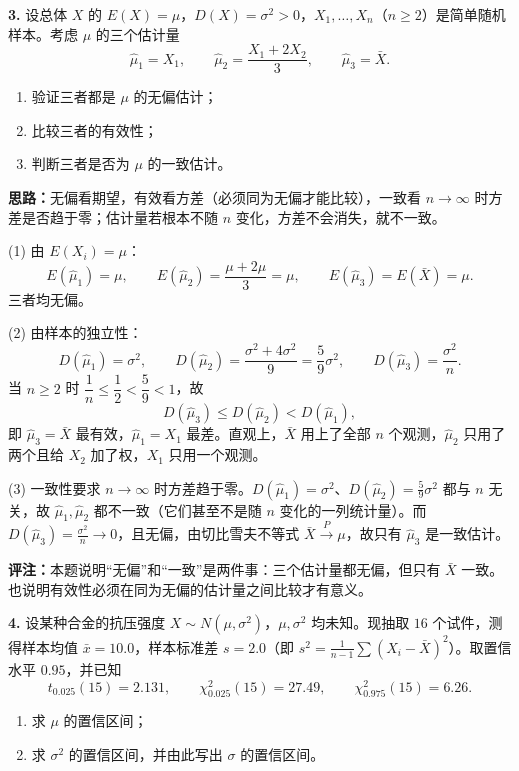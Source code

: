 
\else \answerarea[10] \fi%
\textbf{3.} 设总体 $X$ 的 $E(X)=\mu$，$D(X)=\sigma^{2}>0$，$X_1,\ldots,X_n$（$n\geqslant2$）是简单随机样本。考虑 $\mu$ 的三个估计量
\[
\widehat\mu_1=X_1,\qquad
\widehat\mu_2=\frac{X_1+2X_2}{3},\qquad
\widehat\mu_3=\bar X.
\]
\begin{enumerate}[label=(\arabic*)]
    \item 验证三者都是 $\mu$ 的无偏估计；
    \item 比较三者的有效性；
    \item 判断三者是否为 $\mu$ 的一致估计。
\end{enumerate}

\ifshowsolutions%
\textbf{思路：}无偏看期望，有效看方差（必须同为无偏才能比较），一致看 $n\to\infty$ 时方差是否趋于零；估计量若根本不随 $n$ 变化，方差不会消失，就不一致。

(1) 由 $E(X_i)=\mu$：
\[
E(\widehat\mu_1)=\mu,\qquad
E(\widehat\mu_2)=\frac{\mu+2\mu}{3}=\mu,\qquad
E(\widehat\mu_3)=E(\bar X)=\mu.
\]
三者均无偏。

(2) 由样本的独立性：
\[
D(\widehat\mu_1)=\sigma^{2},\qquad
D(\widehat\mu_2)=\frac{\sigma^{2}+4\sigma^{2}}{9}=\frac{5}{9}\sigma^{2},\qquad
D(\widehat\mu_3)=\frac{\sigma^{2}}{n}.
\]
当 $n\geqslant2$ 时 $\dfrac{1}{n}\leqslant\dfrac{1}{2}<\dfrac{5}{9}<1$，故
\[
D(\widehat\mu_3)\leqslant D(\widehat\mu_2)<D(\widehat\mu_1),
\]
即 $\widehat\mu_3=\bar X$ 最有效，$\widehat\mu_1=X_1$ 最差。直观上，$\bar X$ 用上了全部 $n$ 个观测，$\widehat\mu_2$ 只用了两个且给 $X_2$ 加了权，$X_1$ 只用一个观测。

(3) 一致性要求 $n\to\infty$ 时方差趋于零。$D(\widehat\mu_1)=\sigma^{2}$、$D(\widehat\mu_2)=\frac59\sigma^{2}$ 都与 $n$ 无关，故 $\widehat\mu_1,\widehat\mu_2$ 都不一致（它们甚至不是随 $n$ 变化的一列统计量）。而 $D(\widehat\mu_3)=\frac{\sigma^{2}}{n}\to0$，且无偏，由切比雪夫不等式 $\bar X\xrightarrow{P}\mu$，故只有 $\widehat\mu_3$ 是一致估计。

\textbf{评注：}本题说明“无偏”和“一致”是两件事：三个估计量都无偏，但只有 $\bar X$ 一致。也说明有效性必须在同为无偏的估计量之间比较才有意义。


\else \answerarea[8] \fi%
\textbf{4.} 设某种合金的抗压强度 $X\sim N(\mu,\sigma^{2})$，$\mu,\sigma^{2}$ 均未知。现抽取 $16$ 个试件，测得样本均值 $\bar x=10.0$，样本标准差 $s=2.0$（即 $s^{2}=\frac{1}{n-1}\sum(X_i-\bar X)^{2}$）。取置信水平 $0.95$，并已知
\[
t_{0.025}(15)=2.131,\qquad
\chi^{2}_{0.025}(15)=27.49,\qquad
\chi^{2}_{0.975}(15)=6.26 .
\]
\begin{enumerate}[label=(\arabic*)]
    \item 求 $\mu$ 的置信区间；
    \item 求 $\sigma^{2}$ 的置信区间，并由此写出 $\sigma$ 的置信区间。
\end{enumerate}

